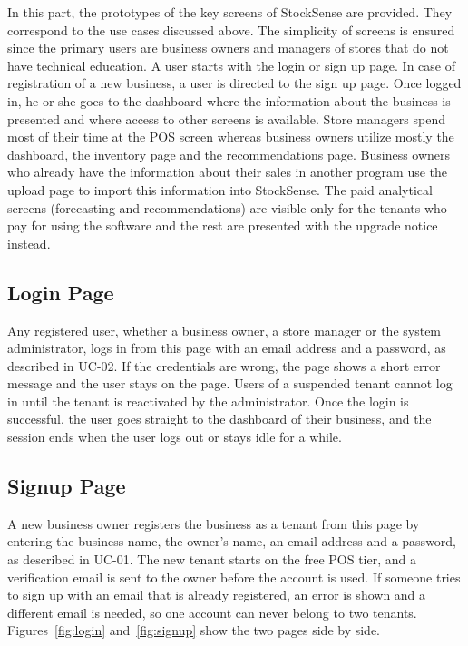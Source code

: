 \documentclass{StockSense}
\begin{document}
In this part, the prototypes of the key screens of StockSense are provided. They correspond to the use cases discussed above. The simplicity of screens is ensured since the primary users are business owners and managers of stores that do not have technical education. A user starts with the login or sign up page. In case of registration of a new business, a user is directed to the sign up page. Once logged in, he or she goes to the dashboard where the information about the business is presented and where access to other screens is available. Store managers spend most of their time at the POS screen whereas business owners utilize mostly the dashboard, the inventory page and the recommendations page. Business owners who already have the information about their sales in another program use the upload page to import this information into StockSense. The paid analytical screens (forecasting and recommendations) are visible only for the tenants who pay for using the software and the rest are presented with the upgrade notice instead.

\subsection{Login Page}

Any registered user, whether a business owner, a store manager or the system administrator, logs in from this page with an email address and a password, as described in UC-02. If the credentials are wrong, the page shows a short error message and the user stays on the page. Users of a suspended tenant cannot log in until the tenant is reactivated by the administrator. Once the login is successful, the user goes straight to the dashboard of their business, and the session ends when the user logs out or stays idle for a while.

\subsection{Signup Page}

A new business owner registers the business as a tenant from this page by entering the business name, the owner's name, an email address and a password, as described in UC-01. The new tenant starts on the free POS tier, and a verification email is sent to the owner before the account is used. If someone tries to sign up with an email that is already registered, an error is shown and a different email is needed, so one account can never belong to two tenants. Figures~\ref{fig:login} and~\ref{fig:signup} show the two pages side by side.
\end{document}
